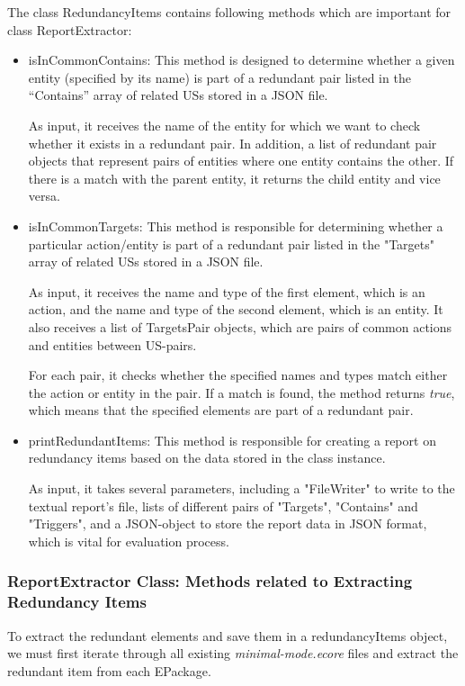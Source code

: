 The class RedundancyItems contains following methods which are important for class ReportExtractor:
\begin{itemize}
	\item isInCommonContains: This method is designed to determine whether a given entity (specified by its name) is part of a redundant pair listed in the \enquote{Contains} array of related USs stored in a JSON file.
	
	As input, it receives the name of the entity for which we want to check whether it exists in a redundant pair. In addition, a list of redundant pair objects that represent pairs of entities where one entity contains the other. If there is a match with the parent entity, it returns the child entity and vice versa.
	\item isInCommonTargets: This method is responsible for determining whether a particular action/entity is part of a redundant pair listed in the "Targets" array of related USs stored in a JSON file.
	
	As input, it receives the name and type of the first element, which is an action, and the name and type of the second element, which is an entity. It also receives a list of TargetsPair objects, which are pairs of common actions and entities between US-pairs.
	
	For each pair, it checks whether the specified names and types match either the action or entity in the pair. If a match is found, the method returns \textit{true}, which means that the specified elements are part of a redundant pair.
	\item printRedundantItems: This method is responsible for creating a report on redundancy items based on the data stored in the class instance. 
	
	As input, it takes several parameters, including a "FileWriter" to write to the textual report's file, lists of different pairs of "Targets", "Contains" and "Triggers", and a JSON-object to store the report data in JSON format, which is vital for evaluation process.
\end{itemize}
\subsubsection*{ReportExtractor Class: Methods related to Extracting Redundancy Items}
To extract the redundant elements and save them in a redundancyItems object, we must first iterate through all existing \textit{minimal-mode.ecore} files and extract the redundant item from each EPackage.

